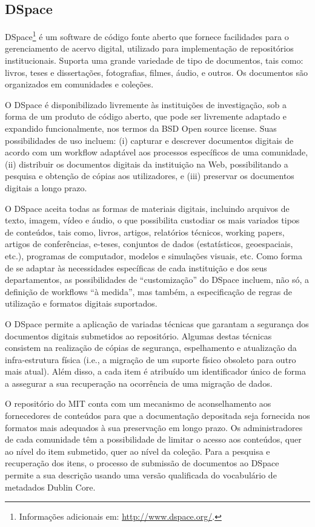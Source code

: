 \subsection*{DSpace}

DSpace\footnote{Informações adicionais em: \url{http://www.dspace.org/}.} é um software de código fonte aberto que fornece facilidades para o gerenciamento de acervo digital, utilizado para implementação de repositórios institucionais. Suporta uma grande variedade de tipo de documentos, tais como: livros, teses e dissertações, fotografias, filmes, áudio, e outros. Os documentos são organizados em comunidades e coleções.

O DSpace é disponibilizado livremente às instituições de investigação, sob a forma de um produto de código aberto, que pode ser livremente adaptado e expandido funcionalmente, nos termos da BSD Open source license. Suas possibilidades de uso incluem: (i) capturar e descrever documentos digitais de acordo com um workflow adaptável aos processos específicos de uma comunidade, (ii) distribuir os documentos digitais da instituição na Web, possibilitando a pesquisa e obtenção de cópias aos utilizadores, e (iii) preservar os documentos digitais a longo prazo.

O DSpace aceita todas as formas de materiais digitais, incluindo arquivos de texto, imagem, vídeo e áudio, o que possibilita custodiar os mais variados tipos de conteúdos, tais como, livros, artigos, relatórios técnicos, working papers, artigos de conferências, e-teses, conjuntos de dados (estatísticos, geoespaciais, etc.), programas de computador, modelos e simulações visuais, etc. Como forma de se adaptar às necessidades específicas de cada instituição e dos seus departamentos, as possibilidades de “customização” do DSpace incluem, não só, a definição de workflows “à medida”, mas também, a especificação de regras de utilização e formatos digitais suportados.

O DSpace permite a aplicação de variadas técnicas que garantam a segurança dos documentos digitais submetidos ao repositório. Algumas destas técnicas consistem na realização de cópias de segurança, espelhamento e atualização da infra-estrutura física (i.e., a migração de um suporte físico obsoleto para outro mais atual). Além disso, a cada item é atribuído um identificador único de forma a assegurar a sua recuperação na ocorrência de uma migração de dados.

O repositório do MIT conta com um mecanismo de aconselhamento aos fornecedores de conteúdos para que a documentação depositada seja fornecida nos formatos mais adequados à sua preservação em longo prazo. Os administradores de cada comunidade têm a possibilidade de limitar o acesso aos conteúdos, quer ao nível do item submetido, quer ao nível da coleção. Para a pesquisa e recuperação dos itens, o processo de submissão de documentos ao DSpace permite a sua descrição usando uma versão qualificada do vocabulário de metadados Dublin Core.

